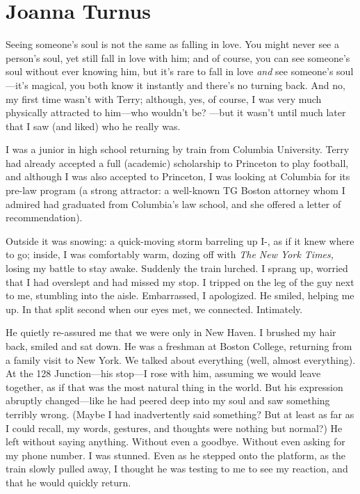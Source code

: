 \chapter{Joanna Turnus}

\titlemark

Seeing someone's soul is not the same as falling in love. You might
never see a person's soul, yet still fall in love with him; and of
course, you can see someone's soul without ever knowing him, but it's
rare to fall in love \emph{and} see someone's soul---it's magical, you
both know it instantly and there's no turning back. And no, my first
time wasn't with Terry; although, yes, of course, I was very much
physically attracted to him---who wouldn't be? ---but it wasn't until
much later that I saw (and liked) who he really was.

I was a junior in high school returning by train from Columbia
University. Terry had already accepted a full (academic) scholarship to
Princeton to play football, and although I was also accepted to
Princeton, I was looking at Columbia for its pre-law program (a strong
attractor: a well-known TG Boston attorney whom I admired had graduated
from Columbia's law school, and she offered a letter of recommendation).

Outside it was snowing: a quick-moving storm barreling up
I-, as if it knew where to go; inside, I was comfortably
warm, dozing off with \emph{The New York Times,} losing my battle to
stay awake. Suddenly the train lurched. I sprang up, worried that I had
overslept and had missed my stop. I tripped on the leg of the guy next
to me, stumbling into the aisle. Embarrassed, I apologized. He smiled,
helping me up. In that split second when our eyes met, we connected.
Intimately.

He quietly re-assured me that we were only in New Haven. I brushed my
hair back, smiled and sat down. He was a freshman at Boston College,
returning from a family visit to New York. We talked about everything
(well, almost everything). At the 128 Junction---his stop---I rose with
him, assuming we would leave together, as if that was the most natural
thing in the world. But his expression abruptly changed---like he had
peered deep into my soul and saw something terribly wrong. (Maybe I had
inadvertently said something? But at least as far as I could recall, my
words, gestures, and thoughts were nothing but normal?) He left without
saying anything. Without even a goodbye. Without even asking for my
phone number. I was stunned. Even as he stepped onto the platform, as
the train slowly pulled away, I thought he was testing to me to see my
reaction, and that he would quickly return.

